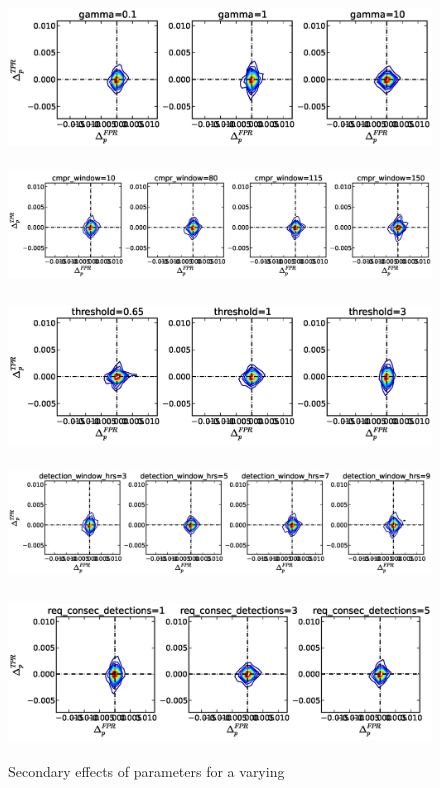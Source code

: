 \begin{figure}[!h]
\begin{center}
\includegraphics[height=1.5in]{../fig/final/delta_hist_sec/w_smooth/gamma}
\includegraphics[height=1.5in]{../fig/final/delta_hist_sec/w_smooth/cmpr_window}
\includegraphics[height=1.5in]{../fig/final/delta_hist_sec/w_smooth/threshold}
\includegraphics[height=1.5in]{../fig/final/delta_hist_sec/w_smooth/detection_window_hrs}
\includegraphics[height=1.5in]{../fig/final/delta_hist_sec/w_smooth/req_consec_detections}
\end{center}
\caption{\label{fig:delta_sec4} Secondary effects of parameters for a varying }
\end{figure}

